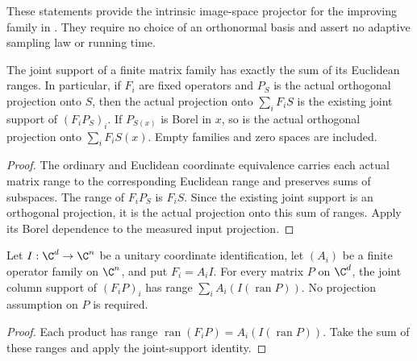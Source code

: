 These statements provide the intrinsic image-space projector for the
improving family in \cite[lines 597--622]{Arad2016RigorousRG}.
They require no choice of an orthonormal basis and assert no adaptive
sampling law or running time.

\begin{lemma}
    \label{lem:actual_finite_family_image_projection}
    \leanok
    The joint support of a finite matrix family has exactly the sum of
    its Euclidean ranges. In particular, if $F_i$ are fixed operators
    and $P_S$ is the actual orthogonal projection onto $S$, then the
    actual projection onto $\sum_iF_iS$ is the existing joint support of
    $(F_iP_S)_i$. If $P_{S(x)}$ is Borel in $x$, so is the actual
    orthogonal projection onto $\sum_iF_iS(x)$. Empty families and zero
    spaces are included.
\end{lemma}
\begin{proof}\leanok
    The ordinary and Euclidean coordinate equivalence carries each
    actual matrix range to the corresponding Euclidean range and
    preserves sums of subspaces. The range of $F_iP_S$ is $F_iS$.
    Since the existing joint support is an orthogonal projection, it is
    the actual projection onto this sum of ranges. Apply its Borel
    dependence to the measured input projection.
\end{proof}


\begin{theorem}
    \label{thm:family_image_prescribed_coordinates}
    \leanok
    Let $I:\C^d\to\C^n$ be a unitary coordinate identification, let
    $(A_i)$ be a finite operator family on $\C^n$, and put $F_i=A_iI$.
    For every matrix $P$ on $\C^d$, the joint column support of $(F_iP)_i$
    has range $\sum_i A_i(I(\operatorname{ran}P))$.
    No projection assumption on $P$ is required.
\end{theorem}
\begin{proof}\leanok
    Each product has range
    $\operatorname{ran}(F_iP)=A_i(I(\operatorname{ran}P))$.
    Take the sum of these ranges and apply the joint-support identity.
\end{proof}
